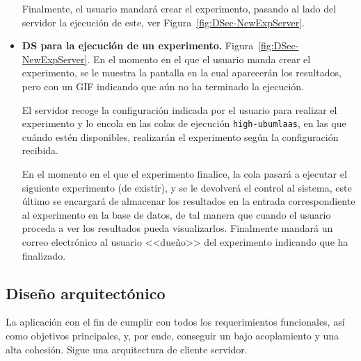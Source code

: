 \begin{itemize}
Finalmente, el usuario mandará crear el experimento, pasando al lado del servidor la ejecución de este, ver Figura~\ref{fig:DSec-NewExpServer}.

\item \textbf{DS para la ejecución de un experimento.} Figura~\ref{fig:DSec-NewExpServer}. En el momento en el que el usuario manda crear el experimento, se le muestra la pantalla en la cual aparecerán los resultados, pero con un GIF indicando que aún no ha terminado la ejecución. 

El servidor recoge la configuración indicada por el usuario para realizar el experimento y lo encola en las colas de ejecución \texttt{high-ubumlaas}, en las que cuándo estén disponibles, realizarán el experimento según la configuración recibida. 

En el momento en el que el experimento finalice, la cola pasará a ejecutar el siguiente experimento (de existir), y se le devolverá el control al sistema, este último se encargará de almacenar los resultados en la entrada correspondiente al experimento en la base de datos, de tal manera que cuando el usuario proceda a ver los resultados pueda visualizarlos. Finalmente mandará un correo electrónico al usuario <<dueño>> del experimento indicando que ha finalizado.

\end{itemize}

\clearpage
{}
\begin{landscape}
\end{landscape}

\subsection{Diseño arquitectónico}
La aplicación con el fin de cumplir con todos los requerimientos funcionales, así como objetivos principales, y, por ende, conseguir un bajo acoplamiento y una alta cohesión. Sigue una arquitectura de cliente servidor.

